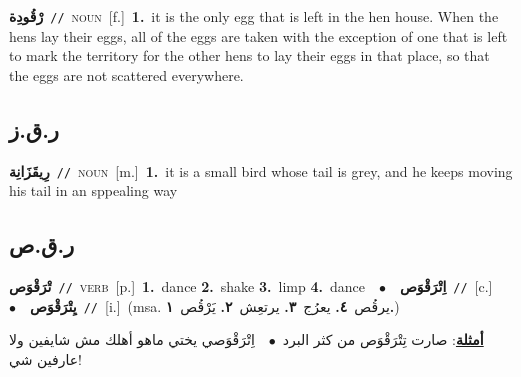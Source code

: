\documentclass[10pt,a4paper,twoside]{article} %
\begin{document}
\begin{multicols}{2}
{\setlength\topsep{0pt}\textbf{\foreignlanguage{arabic}{رْقُودِة}}\ {\color{gray}\texttt{//}\color{black}}\ \textsc{noun}\ [f.]\ \textbf{1.}~it is the only egg that is left in the hen house. When the hens lay their eggs, all of the eggs are taken with the exception of one that is left to mark the territory for the other hens to lay their eggs in that place, so that the eggs are not scattered everywhere.\ } \vspace{2mm}

\vspace{-3mm}
\subsection*{\color{blue}\foreignlanguage{arabic}{ر.ق.ز}\color{blue}{ (ntws)}} 

{\setlength\topsep{0pt}\textbf{\foreignlanguage{arabic}{رِيقَزَانِة}}\ {\color{gray}\texttt{//}\color{black}}\ \textsc{noun}\ [m.]\ \textbf{1.}~it is a small bird whose tail is grey, and he keeps moving his tail in an sppealing way\ } \vspace{2mm}

\vspace{-3mm}
\subsection*{\color{blue}\foreignlanguage{arabic}{ر.ق.ص}\color{blue}{}} 

{\setlength\topsep{0pt}\textbf{\foreignlanguage{arabic}{تْرَقْوَص}}\ {\color{gray}\texttt{//}\color{black}}\ \textsc{verb}\ [p.]\ \textbf{1.}~dance  \textbf{2.}~shake  \textbf{3.}~limp  \textbf{4.}~dance\ \ $\bullet$\ \ \setlength\topsep{0pt}\textbf{\foreignlanguage{arabic}{اِتْرَقْوَص}}\ {\color{gray}\texttt{//}\color{black}}\ [c.]\ \ $\bullet$\ \ \setlength\topsep{0pt}\textbf{\foreignlanguage{arabic}{يِتْرَقْوَص}}\ {\color{gray}\texttt{//}\color{black}}\ [i.]\ \color{gray}(msa. \foreignlanguage{arabic}{يرقُص}~\foreignlanguage{arabic}{\textbf{٤.}}  \foreignlanguage{arabic}{يعرُج}~\foreignlanguage{arabic}{\textbf{٣.}}  \foreignlanguage{arabic}{يرتعِش}~\foreignlanguage{arabic}{\textbf{٢.}}  \foreignlanguage{arabic}{يَرْقُص}~\foreignlanguage{arabic}{\textbf{١.}})\color{black}\  \begin{flushright}\color{gray}\foreignlanguage{arabic}{\textbf{\underline{\foreignlanguage{arabic}{أمثلة}}}: صارت تِتْرَقْوَص من كثر البرد\ $\bullet$\ \  اِتْرَقْوَصي يختي ماهو أهلك مش شايفين ولا عارفين شي!}\end{flushright}\color{black}} \vspace{2mm}


\end{multicols}
\end{document}
